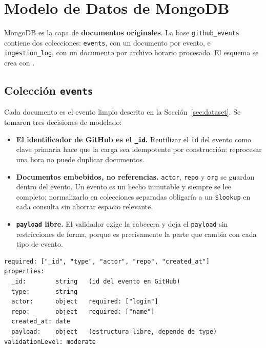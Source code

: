 \section{Modelo de Datos de MongoDB}
\label{sec:mongodb}

MongoDB es la capa de \textbf{documentos originales}. La base \texttt{github\_events} contiene dos colecciones: \texttt{events}, con un documento por evento, e \texttt{ingestion\_log}, con un documento por archivo horario procesado. El esquema se crea con .

\subsection{Colección \texttt{events}}

Cada documento es el evento limpio descrito en la Sección~\ref{sec:dataset}. Se tomaron tres decisiones de modelado:

\begin{itemize}[leftmargin=*]
    \item \textbf{El identificador de GitHub es el \texttt{\_id}.} Reutilizar el \texttt{id} del evento como clave primaria hace que la carga sea idempotente por construcción: reprocesar una hora no puede duplicar documentos.
    \item \textbf{Documentos embebidos, no referencias.} \texttt{actor}, \texttt{repo} y \texttt{org} se guardan dentro del evento. Un evento es un hecho inmutable y siempre se lee completo; normalizarlo en colecciones separadas obligaría a un \texttt{\$lookup} en cada consulta sin ahorrar espacio relevante.
    \item \textbf{\texttt{payload} libre.} El validador exige la cabecera y deja el \texttt{payload} sin restricciones de forma, porque es precisamente la parte que cambia con cada tipo de evento.
\end{itemize}

\begin{lstlisting}[style=plano]
required: ["_id", "type", "actor", "repo", "created_at"]
properties:
  _id:        string   (id del evento en GitHub)
  type:       string
  actor:      object   required: ["login"]
  repo:       object   required: ["name"]
  created_at: date
  payload:    object   (estructura libre, depende de type)
validationLevel: moderate
\end{lstlisting}


